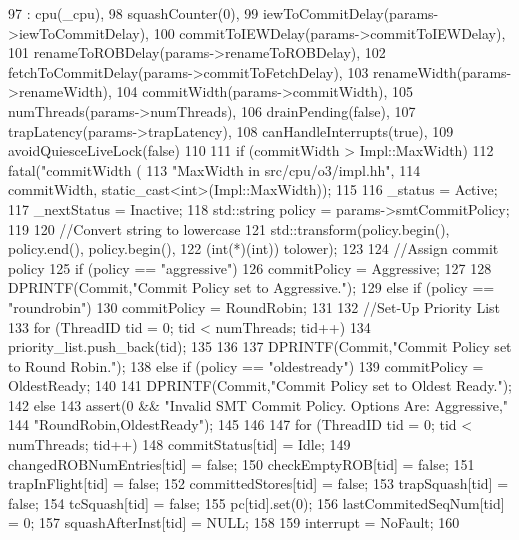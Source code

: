 \begin{DoxyCode}
97     : cpu(_cpu),
98       squashCounter(0),
99       iewToCommitDelay(params->iewToCommitDelay),
100       commitToIEWDelay(params->commitToIEWDelay),
101       renameToROBDelay(params->renameToROBDelay),
102       fetchToCommitDelay(params->commitToFetchDelay),
103       renameWidth(params->renameWidth),
104       commitWidth(params->commitWidth),
105       numThreads(params->numThreads),
106       drainPending(false),
107       trapLatency(params->trapLatency),
108       canHandleInterrupts(true),
109       avoidQuiesceLiveLock(false)
110 {
111     if (commitWidth > Impl::MaxWidth)
112         fatal("commitWidth (%
113              "\tincrease MaxWidth in src/cpu/o3/impl.hh\n",
114              commitWidth, static_cast<int>(Impl::MaxWidth));
115 
116     _status = Active;
117     _nextStatus = Inactive;
118     std::string policy = params->smtCommitPolicy;
119 
120     //Convert string to lowercase
121     std::transform(policy.begin(), policy.end(), policy.begin(),
122                    (int(*)(int)) tolower);
123 
124     //Assign commit policy
125     if (policy == "aggressive"){
126         commitPolicy = Aggressive;
127 
128         DPRINTF(Commit,"Commit Policy set to Aggressive.\n");
129     } else if (policy == "roundrobin"){
130         commitPolicy = RoundRobin;
131 
132         //Set-Up Priority List
133         for (ThreadID tid = 0; tid < numThreads; tid++) {
134             priority_list.push_back(tid);
135         }
136 
137         DPRINTF(Commit,"Commit Policy set to Round Robin.\n");
138     } else if (policy == "oldestready"){
139         commitPolicy = OldestReady;
140 
141         DPRINTF(Commit,"Commit Policy set to Oldest Ready.");
142     } else {
143         assert(0 && "Invalid SMT Commit Policy. Options Are: {Aggressive,"
144                "RoundRobin,OldestReady}");
145     }
146 
147     for (ThreadID tid = 0; tid < numThreads; tid++) {
148         commitStatus[tid] = Idle;
149         changedROBNumEntries[tid] = false;
150         checkEmptyROB[tid] = false;
151         trapInFlight[tid] = false;
152         committedStores[tid] = false;
153         trapSquash[tid] = false;
154         tcSquash[tid] = false;
155         pc[tid].set(0);
156         lastCommitedSeqNum[tid] = 0;
157         squashAfterInst[tid] = NULL;
158     }
159     interrupt = NoFault;
160 }
\end{DoxyCode}


